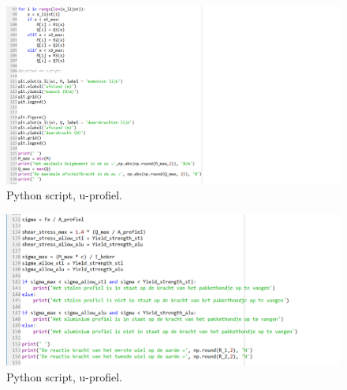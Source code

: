 \begin{figure}[H]
    \centering
    \includegraphics[width = 120mm]{06_bijlage_F/onderkant_u_profiel/forloop_onderkant.PNG}
    \caption{Python script, u-profiel.}
    \label{fig:u-profiel_forloop}
\end{figure}
\vspace{\baselineskip}

\begin{figure}[H]
    \centering
    \includegraphics[width = 120mm]{06_bijlage_F/onderkant_u_profiel/print2_onderkant.PNG}
    \caption{Python script, u-profiel.}
    \label{fig:u-profiel_print}
\end{figure}
\vspace{\baselineskip}






